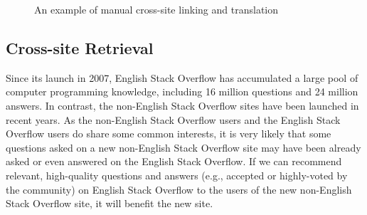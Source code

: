 
\begin{figure}
	\centering
	\hfill
	\caption{An example of manual cross-site linking and translation}
	\label{fig:linkExample}
\end{figure}

\subsection{Cross-site Retrieval}
\label{sec:crossLinking}
Since its launch in 2007, English Stack Overflow has accumulated a large pool of computer programming knowledge, including 16 million questions and 24 million answers.
In contrast, the non-English Stack Overflow sites have been launched in recent years.
As the non-English Stack Overflow users and the English Stack Overflow users do share some common interests, it is very likely that some questions asked on a new non-English Stack Overflow site may have been already asked or even answered on the English Stack Overflow.
If we can recommend relevant, high-quality questions and answers (e.g., accepted or highly-voted by the community) on English Stack Overflow to the users of the new non-English Stack Overflow site, it will benefit the new site.

